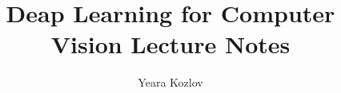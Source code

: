\graphicspath{{dl_notebook/deep_learning/}}




\title{Deap Learning for Computer Vision Lecture Notes}
\author{Yeara Kozlov}
\date{}

\maketitle

\tableofcontents
\cleardoublepage




